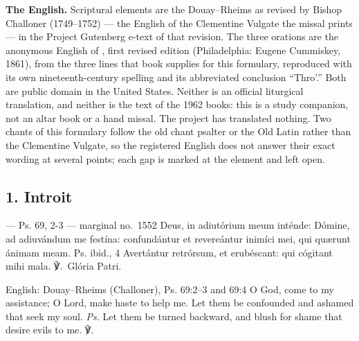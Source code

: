 \textbf{The English.} Scriptural elements are the Douay--Rheims as revised by
Bishop Challoner (1749--1752) --- the English of the Clementine Vulgate the
missal prints --- in the Project Gutenberg e-text of that revision. The three
orations are the anonymous English of , first revised edition
(Philadelphia: Eugene Cummiskey, 1861), from the three lines that book
supplies for this formulary, reproduced with its own nineteenth-century
spelling and its abbreviated conclusion ``Thro'.'' Both are public domain in
the United States. Neither is an official liturgical translation, and neither
is the text of the 1962 books: this is a study companion, not an altar book or
a hand missal. The project has translated nothing. Two chants of this
formulary follow the old chant psalter or the Old Latin rather than the
Clementine Vulgate, so the registered English does not answer their exact
wording at several points; each gap is marked at the element and left open.

\elementguard
\subsection*{1. Introit }

\begin{appointedlatin}{ --- Ps. 69, 2-3 --- marginal no.\ 1552}
Deus, in adiutórium meum inténde: Dómine, ad adiuvándum me festína:
confundántur et revereántur inimíci mei, qui quærunt ánimam meam.
\textnormal{Ps. ibid., 4} Avertántur retrórsum, et erubéscant: qui cógitant
mihi mala. ℣.~Glória Patri.
\end{appointedlatin}

\begin{namedtranslation}{English: Douay--Rheims (Challoner), Ps. 69:2--3 and 69:4}
O God, come to my assistance; O Lord, make haste to help me. Let them be
confounded and ashamed that seek my soul. \textit{Ps.} Let them be turned
backward, and blush for shame that desire evils to me.
℣.~
\end{namedtranslation}


